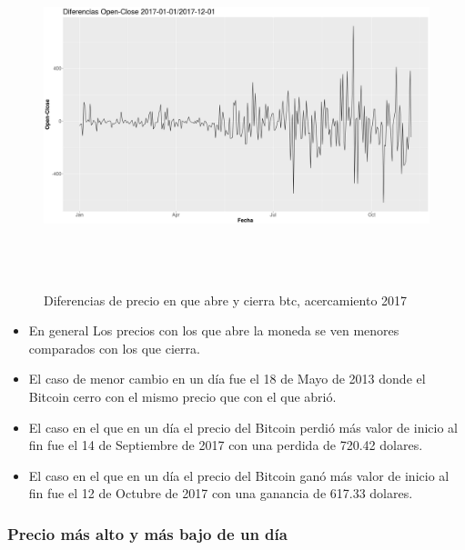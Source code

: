 \documentclass[12pt,letterpaper]{article}
\begin{document}
    \begin{figure}
        \centering

        \includegraphics[width = 18cm, height = 10cm]{btc/diferencias_BTC_OpenClose_2}

        \caption{Diferencias de precio en que abre y cierra btc, acercamiento 2017}
    \end{figure}


    \begin{itemize}

        \item En general Los precios con los que abre la moneda se ven menores comparados con los que cierra.

        \item El caso de menor cambio en un d\'ia fue el 18 de Mayo de 2013 donde el Bitcoin cerro con el mismo precio que con el que abri\'o.

        \item El caso en el que en un d\'ia el precio del Bitcoin perdi\'o m\'as valor de inicio al fin fue el 14 de Septiembre de 2017 con una perdida de 720.42 dolares.

        \item El caso en el que en un d\'ia el precio del Bitcoin gan\'o m\'as valor de inicio al fin fue el 12 de Octubre de 2017 con una ganancia de 617.33 dolares.

    \end{itemize}


    \subsubsection*{Precio más alto y más bajo de un día}
\end{document}
